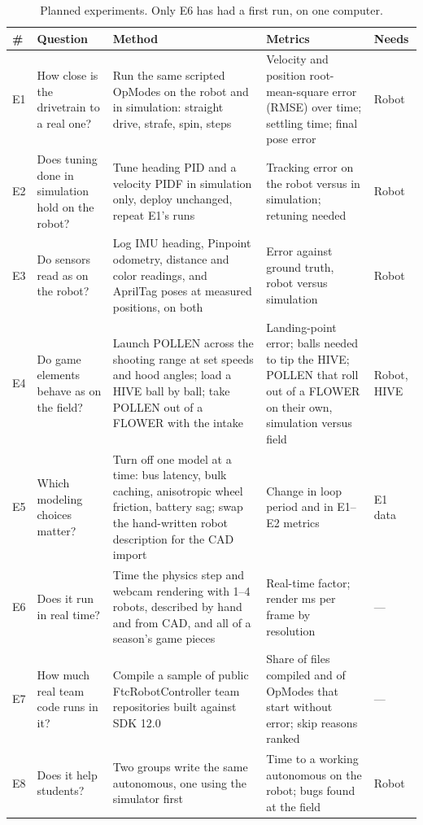 \documentclass[10pt,twocolumn,letterpaper]{article}
\begin{document}
\begin{table}[t]
\centering
\small
\caption{Planned experiments. Only E6 has had a first run, on one computer.}\label{tab:eval}
\begin{tabularx}{\textwidth}{@{}>{\raggedright\arraybackslash}p{0.6cm}>{\raggedright\arraybackslash}p{3.3cm}L>{\raggedright\arraybackslash}p{4.0cm}>{\raggedright\arraybackslash}p{1.2cm}@{}}
\toprule
\textbf{\#} & \textbf{Question} & \textbf{Method} & \textbf{Metrics} & \textbf{Needs} \\
\midrule
E1 & How close is the drivetrain to a real one? & Run the same scripted OpModes on the robot and in simulation: straight drive, strafe, spin,  steps & Velocity and position root-mean-square error (RMSE) over time; settling time; final pose error & Robot \\
E2 & Does tuning done in simulation hold on the robot? & Tune heading PID and a velocity PIDF in simulation only, deploy unchanged, repeat E1's runs & Tracking error on the robot versus in simulation; retuning needed & Robot \\
E3 & Do sensors read as on the robot? & Log IMU heading, Pinpoint odometry, distance and color readings, and AprilTag poses at measured positions, on both & Error against ground truth, robot versus simulation & Robot \\
E4 & Do game elements behave as on the field? & Launch POLLEN across the shooting range at set speeds and hood angles; load a HIVE ball by ball; take POLLEN out of a FLOWER with the intake & Landing-point error; balls needed to tip the HIVE; POLLEN that roll out of a FLOWER on their own, simulation versus field & Robot, HIVE \\
E5 & Which modeling choices matter? & Turn off one model at a time: bus latency, bulk caching, anisotropic wheel friction, battery sag; swap the hand-written robot description for the CAD import & Change in loop period and in E1–E2 metrics & E1 data \\
E6 & Does it run in real time? & Time the physics step and webcam rendering with 1–4 robots, described by hand and from CAD, and all of a season's game pieces & Real-time factor; render ms per frame by resolution & — \\
E7 & How much real team code runs in it? & Compile a sample of public FtcRobotController team repositories built against SDK 12.0 & Share of files compiled and of OpModes that start without error; skip reasons ranked & — \\
E8 & Does it help students? & Two groups write the same autonomous, one using the simulator first & Time to a working autonomous on the robot; bugs found at the field & Robot \\
\bottomrule
\end{tabularx}
\end{table}
\end{document}
